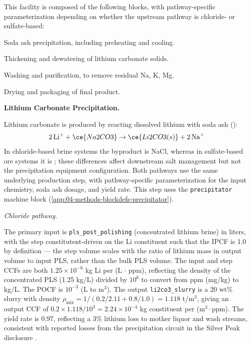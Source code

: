 This facility is composed of the following blocks, with pathway-specific parameterization depending on whether the upstream pathway is chloride- or sulfate-based:

\begin{description}[noitemsep, topsep=0pt]
    \item[\textbullet\enskip\texttt{Lithium Carbonate Precipitation:}] Soda ash precipitation, including preheating and cooling.
    \item[\textbullet\enskip\texttt{Thickening and Dewatering:}] Thickening and dewatering of lithium carbonate solids.
    \item[\textbullet\enskip\texttt{Washing and Purification:}] Washing and purification, to remove residual Na, K, Mg. 
    \item[\textbullet\enskip\texttt{Drying and Packaging:}] Drying and packaging of final product.
\end{description}

\medskip
\noindent\textbf{Lithium Carbonate Precipitation.}\quad

Lithium carbonate is produced by reacting dissolved lithium with soda ash ():
\begin{equation}
    2\,\text{Li}^+ + \ce{Na2CO3} \rightarrow \ce{Li2CO3(s)} + 2\,\text{Na}^+
\end{equation}
In chloride-based brine systems the byproduct is NaCl, whereas in sulfate-based ore systems it is ; these differences affect downstream salt management but not the precipitation equipment configuration. Both pathways use the same underlying production step, with pathway-specific parameterization for the input chemistry, soda ash dosage, and yield rate.
This step uses the \texttt{precipitator} machine block (\ref{app:04-methods-blockdefs-precipitator}).

\medskip
\noindent\textit{Chloride pathway.}\quad
 
The primary input is \texttt{pls\_post\_polishing} (concentrated lithium brine) in liters, with the step constitutent-driven on the Li constituent such that the IPCF is 1.0 by definition --- the step volume scales with the ratio of lithium mass in output volume to input PLS, rather than the bulk PLS volume. The input and step CCFs are both $1.25 \times 10^{-6}$ kg Li per (L $\cdot$ ppm), reflecting the density of the concentrated PLS (1.25 kg/L) divided by $10^6$ to convert from ppm (mg/kg) to kg/L. The POCF is $10^{-3}$ (L to m$^3$). The output \texttt{li2co3\_slurry} is a 20 wt\%  slurry with density $\rho_\text{mix} = 1/(0.2/2.11 + 0.8/1.0) = 1.118$ t/m$^3$, giving an output CCF of $0.2 \times 1.118 / 10^3 = 2.24 \times 10^{-4}$ kg constituent per (m$^3 \cdot$ppm). The yield rate is 0.97, reflecting a 3\% lithium loss to mother liquor and wash streams, consistent with reported losses from the precipitation circuit in the Silver Peak disclosure \cite{srkconsultingSECTechnicalReport2023a}.
 
